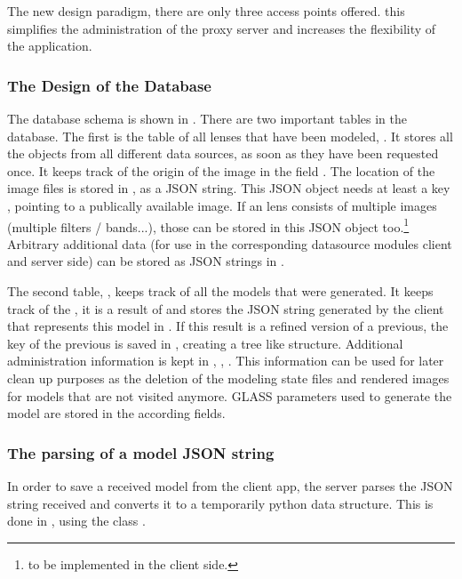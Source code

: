 The new design paradigm, there are only three access points offered. this simplifies the administration of the proxy server and increases the flexibility of the application.




\subsubsection{The Design of the Database}



The database schema is shown in .
There are two important tables in the database.
The first is the table of all lenses that have been modeled, .
It stores all the objects from all different data sources, as soon as they have been requested once.
It keeps track of the origin of the image in the field .
The location of the image files is stored in , as a JSON string.
This JSON object needs at least a key , pointing to a publically available image.
If an lens consists of multiple images (multiple filters / bands...), those can be stored in this JSON object too.\footnote{to be implemented in the client side.}
Arbitrary additional data (for use in the corresponding datasource modules client and server side) can be stored as JSON strings in .

The second table, , keeps track of all the models that were generated.
It keeps track of the , it is a result of and stores the JSON string generated by the client that represents this model in .
If this result is a refined version of a previous, the key of the previous is saved in , creating a tree like structure.
Additional administration information is kept in , , .
This information can be used for later clean up purposes as the deletion of the modeling state files and rendered images for models that are not visited anymore.
GLASS parameters used to generate the model are stored in the according fields.


\subsubsection{The parsing of a model JSON string}

In order to save a received model from the client app, the server parses the JSON string received and converts it to a temporarily python data structure.
This is done in , using the class .

